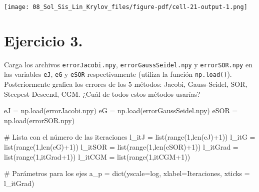\documentclass[
  letterpaper,
  DIV=11,
  numbers=noendperiod]{scrreprt}
\newenvironment{Shaded}{\begin{snugshade}}{\end{snugshade}}
\newcommand{\BuiltInTok}[1]{\textcolor[rgb]{0.00,0.23,0.31}{#1}}
\newcommand{\CommentTok}[1]{\textcolor[rgb]{0.37,0.37,0.37}{#1}}
\newcommand{\DecValTok}[1]{\textcolor[rgb]{0.68,0.00,0.00}{#1}}
\newcommand{\NormalTok}[1]{\textcolor[rgb]{0.00,0.23,0.31}{#1}}
\newcommand{\OperatorTok}[1]{\textcolor[rgb]{0.37,0.37,0.37}{#1}}
\newcommand{\StringTok}[1]{\textcolor[rgb]{0.13,0.47,0.30}{#1}}
\begin{document}
\texttt{[image: 08\_Sol\_Sis\_Lin\_Krylov\_files/figure-pdf/cell-21-output-1.png]}

\section{\texorpdfstring{\textbf{Ejercicio
3.}}{Ejercicio 3.}}\label{ejercicio-3.-3}

Carga los archivos \texttt{errorJacobi.npy},
\texttt{errorGaussSeidel.npy} y \texttt{errorSOR.npy} en las variables
\texttt{eJ}, \texttt{eG} y \texttt{eSOR} respectivamente (utiliza la
función \texttt{np.load()}). Posteriormente grafica los errores de los 5
métodos: Jacobi, Gauss-Seidel, SOR, Steepest Descend, CGM. ¿Cuál de
todos estos métodos usarías?

\begin{Shaded}
\begin{Highlighting}[]
\NormalTok{eJ }\OperatorTok{=}\NormalTok{ np.load(}\StringTok{\textquotesingle{}errorJacobi.npy\textquotesingle{}}\NormalTok{)}
\NormalTok{eG }\OperatorTok{=}\NormalTok{ np.load(}\StringTok{\textquotesingle{}errorGaussSeidel.npy\textquotesingle{}}\NormalTok{)}
\NormalTok{eSOR }\OperatorTok{=}\NormalTok{ np.load(}\StringTok{\textquotesingle{}errorSOR.npy\textquotesingle{}}\NormalTok{)}

\CommentTok{\# Lista con el número de las iteraciones}
\NormalTok{l\_itJ }\OperatorTok{=} \BuiltInTok{list}\NormalTok{(}\BuiltInTok{range}\NormalTok{(}\DecValTok{1}\NormalTok{,}\BuiltInTok{len}\NormalTok{(eJ)}\OperatorTok{+}\DecValTok{1}\NormalTok{)) }
\NormalTok{l\_itG }\OperatorTok{=} \BuiltInTok{list}\NormalTok{(}\BuiltInTok{range}\NormalTok{(}\DecValTok{1}\NormalTok{,}\BuiltInTok{len}\NormalTok{(eG)}\OperatorTok{+}\DecValTok{1}\NormalTok{)) }
\NormalTok{l\_itSOR }\OperatorTok{=} \BuiltInTok{list}\NormalTok{(}\BuiltInTok{range}\NormalTok{(}\DecValTok{1}\NormalTok{,}\BuiltInTok{len}\NormalTok{(eSOR)}\OperatorTok{+}\DecValTok{1}\NormalTok{)) }
\NormalTok{l\_itGrad }\OperatorTok{=} \BuiltInTok{list}\NormalTok{(}\BuiltInTok{range}\NormalTok{(}\DecValTok{1}\NormalTok{,itGrad}\OperatorTok{+}\DecValTok{1}\NormalTok{)) }
\NormalTok{l\_itCGM }\OperatorTok{=} \BuiltInTok{list}\NormalTok{(}\BuiltInTok{range}\NormalTok{(}\DecValTok{1}\NormalTok{,itCGM}\OperatorTok{+}\DecValTok{1}\NormalTok{))}

\CommentTok{\# Parámetros para los ejes}
\NormalTok{a\_p }\OperatorTok{=} \BuiltInTok{dict}\NormalTok{(yscale}\OperatorTok{=}\StringTok{\textquotesingle{}log\textquotesingle{}}\NormalTok{, xlabel}\OperatorTok{=}\StringTok{\textquotesingle{}Iteraciones\textquotesingle{}}\NormalTok{, xticks }\OperatorTok{=}\NormalTok{ l\_itGrad)}


\end{Highlighting}
\end{Shaded}
\end{document}
